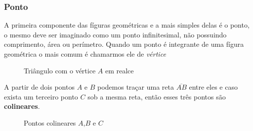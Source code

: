 \begin{multicols*}{2}
    \subsubsection*{Ponto}
    A primeira componente das fíguras geométricas e a mais simples delas é o ponto, o mesmo deve ser imaginado como um
    ponto infinitesimal, não possuindo comprimento, área ou perímetro. Quando um ponto é integrante de uma fígura
    geométrica o mais comum é chamarmos ele de \textit{vértice}
    \begin{figure}[H]
        \centering
        \caption{Triângulo com o vértice $A$ em realce }
    \end{figure}



    A partir de dois pontos $A$ e $B$ podemos traçar uma reta $\overline{AB}$ entre eles e caso exista um terceiro ponto $C$ sob a mesma reta,
    então esses três pontos são \textbf{colineares}.

    \begin{figure}[H]
        \centering
        \caption{Pontos colineares $A$,$B$ e $C$}
        \label{fig:reta_ab}
    \end{figure}


\end{multicols*}
